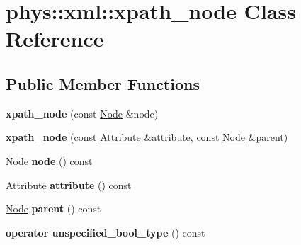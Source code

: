 \hypertarget{classphys_1_1xml_1_1xpath__node}{
\section{phys::xml::xpath\_\-node Class Reference}
\label{d3/d5a/classphys_1_1xml_1_1xpath__node}
}
\subsection*{Public Member Functions}
\begin{DoxyCompactItemize}
\item 
\hypertarget{classphys_1_1xml_1_1xpath__node_ae8586a1e290478eb0da5831410ca06a6}{
{\bfseries xpath\_\-node} (const \hyperlink{classphys_1_1xml_1_1Node}{Node} \&node)}
\label{d3/d5a/classphys_1_1xml_1_1xpath__node_ae8586a1e290478eb0da5831410ca06a6}

\item 
\hypertarget{classphys_1_1xml_1_1xpath__node_a15b9c887277cfb9ef110a9335077e8a2}{
{\bfseries xpath\_\-node} (const \hyperlink{classphys_1_1xml_1_1Attribute}{Attribute} \&attribute, const \hyperlink{classphys_1_1xml_1_1Node}{Node} \&parent)}
\label{d3/d5a/classphys_1_1xml_1_1xpath__node_a15b9c887277cfb9ef110a9335077e8a2}

\item 
\hypertarget{classphys_1_1xml_1_1xpath__node_ae20fea751612e4f6420923905454f29e}{
\hyperlink{classphys_1_1xml_1_1Node}{Node} {\bfseries node} () const }
\label{d3/d5a/classphys_1_1xml_1_1xpath__node_ae20fea751612e4f6420923905454f29e}

\item 
\hypertarget{classphys_1_1xml_1_1xpath__node_a6b017d72d72758b88462fcc49150ab26}{
\hyperlink{classphys_1_1xml_1_1Attribute}{Attribute} {\bfseries attribute} () const }
\label{d3/d5a/classphys_1_1xml_1_1xpath__node_a6b017d72d72758b88462fcc49150ab26}

\item 
\hypertarget{classphys_1_1xml_1_1xpath__node_af5d3872449d0cfdc7c039ec2a8996a8f}{
\hyperlink{classphys_1_1xml_1_1Node}{Node} {\bfseries parent} () const }
\label{d3/d5a/classphys_1_1xml_1_1xpath__node_af5d3872449d0cfdc7c039ec2a8996a8f}

\item 
\hypertarget{classphys_1_1xml_1_1xpath__node_ab756152ed44ef1f54e221b02444c58ec}{
{\bfseries operator unspecified\_\-bool\_\-type} () const }
\label{d3/d5a/classphys_1_1xml_1_1xpath__node_ab756152ed44ef1f54e221b02444c58ec}


\end{DoxyCompactItemize}
